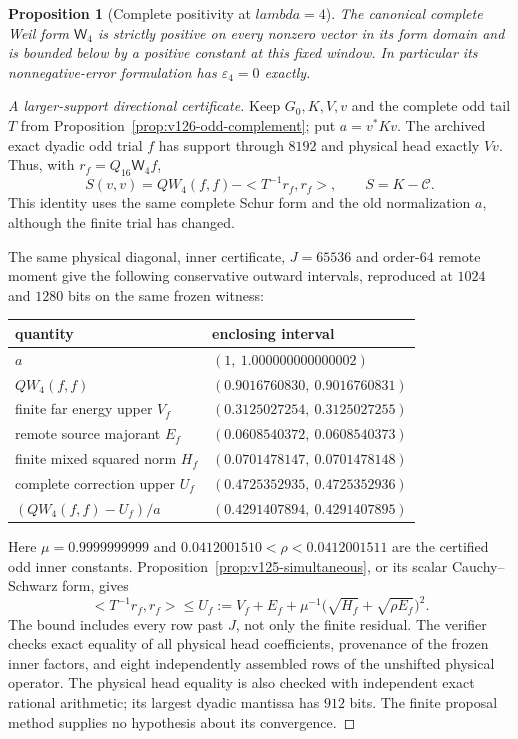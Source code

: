 \documentclass[11pt]{article}
\def\lambda{lambda}%
\def\ip#1#2{<#1,#2>}%
\newtheorem{proposition}[theorem]{Proposition}
\theoremstyle{remark}
\newcommand{\ip}[2]{\left\langle #1,#2\right\rangle}
\begin{document}
\begin{proposition}[Complete positivity at $\lambda=4$]
\label{prop:v126-full-window}
The canonical complete Weil form $\mathsf W_4$ is strictly positive
on every nonzero vector in its form domain and is bounded below
by a positive constant at this fixed window. In particular its
nonnegative-error formulation has $\varepsilon_4=0$ exactly.
\end{proposition}
\begin{proof}[A larger-support directional certificate]
Keep $G_0,K,V,v$ and the complete odd tail $T$ from
Proposition~\ref{prop:v126-odd-complement}; put $a=v^*Kv$.
The archived exact dyadic odd trial $f$ has support through $8192$
and physical head exactly $Vv$. Thus, with $r_f=Q_{16}\mathsf W_4f$,
\[
 S(v,v)=QW_4(f,f)-\ip{T^{-1}r_f}{r_f},\qquad S=K-\mathcal C.
\]
This identity uses the same complete Schur form and the old
normalization $a$, although the finite trial has changed.

The same physical diagonal, inner certificate, $J=65536$ and
order-$64$ remote moment give the following conservative outward
intervals, reproduced at $1024$ and $1280$ bits on the same frozen
witness:
\begin{center}
\begin{tabular}{ll}
\toprule
quantity & enclosing interval\\
\midrule
$a$ & $(1,\ 1.000000000000002)$\\
$QW_4(f,f)$ & $(0.9016760830,\ 0.9016760831)$\\
finite far energy upper $V_f$ & $(0.3125027254,\ 0.3125027255)$\\
remote source majorant $E_f$ & $(0.0608540372,\ 0.0608540373)$\\
finite mixed squared norm $H_f$ & $(0.0701478147,\ 0.0701478148)$\\
complete correction upper $U_f$ & $(0.4725352935,\ 0.4725352936)$\\
$(QW_4(f,f)-U_f)/a$ & $(0.4291407894,\ 0.4291407895)$\\
\bottomrule
\end{tabular}
\end{center}
Here $\mu=0.9999999999$ and
$0.0412001510<\rho<0.0412001511$ are the certified odd inner
constants. Proposition~\ref{prop:v125-simultaneous}, or its scalar
Cauchy--Schwarz form, gives
\[
 \ip{T^{-1}r_f}{r_f}\le U_f
 :=V_f+E_f+\mu^{-1}
          \bigl(\sqrt{H_f}+\sqrt{\rho E_f}\bigr)^2.
\]
The bound includes every row past $J$, not only the finite residual.
The verifier checks exact equality of all physical head coefficients,
provenance of the frozen inner factors, and eight independently
assembled rows of the unshifted physical operator. The physical
head equality is also checked with independent exact rational
arithmetic; its largest dyadic mantissa has $912$ bits. The finite
proposal method supplies no hypothesis about its convergence.


\end{proof}
\end{document}
